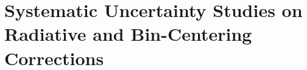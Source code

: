 \documentclass[aps, prl]{revtex4-2}  %
\begin{document}
\section{\large Systematic Uncertainty Studies on Radiative and Bin-Centering Corrections }
\end{document}
